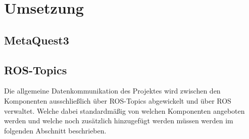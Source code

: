 \chapter{Umsetzung}
\section{MetaQuest3}

\section{ROS-Topics}\label{sec:ros-topics}
Die allgemeine Datenkommunikation des Projektes wird zwischen den Komponenten ausschließlich über \ac{ROS}-Topics abgewickelt und über \ac{ROS} verwaltet. Welche dabei standardmäßig von welchen Komponenten angeboten werden und welche noch zusätzlich hinzugefügt werden müssen werden im folgenden Abschnitt beschrieben.\\
